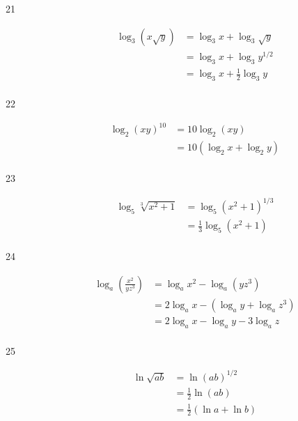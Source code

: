 \documentclass{exam}
\begin{document}
\begin{description}
      \item[21] 
        \begin{align*}
          \log_3 \left( x \sqrt{y} \right) &= \log_3 x + \log_3 \sqrt{y} \\
                                           &= \log_3 x + \log_3 y^{1/2} \\
                                           &= \boxed{\log_3 x + \frac{1}{2} \log_3 y} \\
        \end{align*}

      \item[22] 
        \begin{align*}
          \log_2 (xy)^{10} &= 10 \log_2 (xy) \\
                           &= \boxed{10 (\log_2 x + \log_2 y)} \\
        \end{align*}

      \item[23] 
        \begin{align*}
          \log_5 \sqrt[3]{x^2 + 1} &= \log_5 \left( x^2 + 1 \right)^{1/3} \\
                                   &= \boxed{\frac{1}{3} \log_5 \left( x^2 + 1 \right)} \\
        \end{align*}

      \item[24] 
        \begin{align*}
          \log_a \left( \frac{x^2}{yz^3} \right) &= \log_a x^2 - \log_a \left( yz^3 \right) \\
                                                 &= 2 \log_a x - \left( \log_a y + \log_a z^3 \right) \\
                                                 &= \boxed{2 \log_a x - \log_a y - 3 \log_a z} \\
        \end{align*}

      \item[25] 
        \begin{align*}
          \ln \sqrt{ab} &= \ln (ab)^{1/2} \\
                        &= \frac{1}{2} \ln (ab) \\
                        &= \boxed{\frac{1}{2} (\ln a + \ln b)} \\
        \end{align*}


\end{description}
\end{document}
